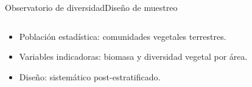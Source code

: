 \documentclass[aspectratio=169, 10pt]{beamer}
\begin{document}
\begin{frame}{Observatorio de diversidad}{Diseño de muestreo}
\begin{columns}
\begin{column}{0.5\textwidth}
\begin{itemize}
\item Población estadística: comunidades vegetales terrestres.
\item Variables indicadoras: biomasa y diversidad vegetal por área.
\item Diseño: sistemático post-estratificado.
\end{itemize}
\end{column}
\begin{column}{0.5\textwidth}




\end{column}
\end{columns}
\end{frame}
\end{document}
